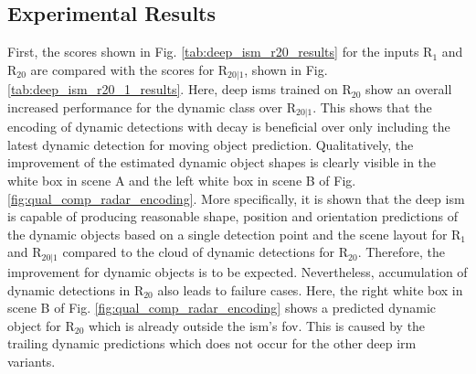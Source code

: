 \subsection{Experimental Results}
First, the scores shown in Fig. \ref{tab:deep_ism_r20_results} for the inputs R$_1$ and R$_{20}$ are compared with the scores for R$_{20|1}$, shown in Fig. \ref{tab:deep_ism_r20_1_results}. Here, deep \gls{ism}s trained on R$_{20}$ show an overall increased performance for the dynamic class over R$_{20|1}$. This shows that the encoding of dynamic detections with decay is beneficial over only including the latest dynamic detection for moving object prediction. Qualitatively, the improvement of the estimated dynamic object shapes is clearly visible in the white box in scene A and the left white box in scene B of Fig. \ref{fig:qual_comp_radar_encoding}. More specifically, it is shown that the deep \gls{ism} is capable of producing reasonable shape, position and orientation predictions of the dynamic objects based on a single detection point and the scene layout for R$_1$ and R$_{20|1}$ compared to the cloud of dynamic detections for R$_{20}$. Therefore, the improvement for dynamic objects is to be expected. Nevertheless, accumulation of dynamic detections in R$_{20}$ also leads to failure cases. Here, the right white box in scene B of Fig. \ref{fig:qual_comp_radar_encoding} shows a predicted dynamic object for R$_{20}$ which is already outside the \gls{ism}'s \gls{fov}. This is caused by the trailing dynamic predictions which does not occur for the other deep \gls{irm} variants.
